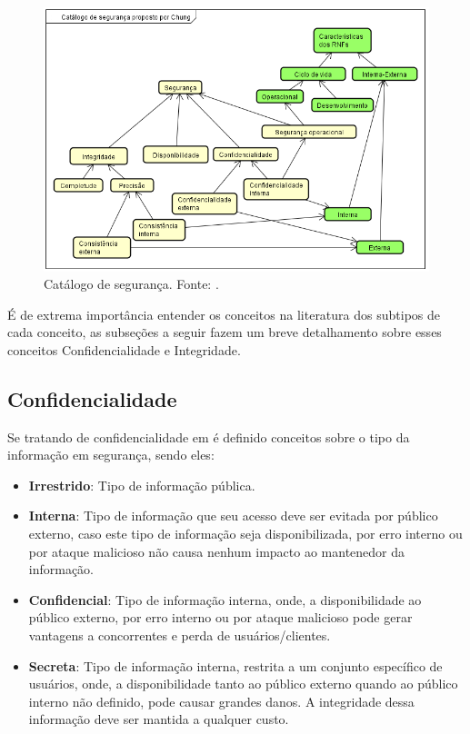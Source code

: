 \begin{figure}[h!]
	\centering
	\includegraphics[keepaspectratio=true,scale=0.9]{figuras/catalogoSegurancaChung.PNG}
	\caption{Catálogo de segurança. Fonte: \cite{chung2012non}.}
	\label{catalogoSegurancaChung}
\end{figure}

É de extrema importância entender os conceitos na literatura dos subtipos de cada conceito, as subseções a seguir fazem um breve detalhamento sobre esses conceitos Confidencialidade e Integridade. 

\subsection{Confidencialidade}

Se tratando de confidencialidade em \cite{reis10classificaccao} é definido conceitos sobre o tipo da informação em segurança, sendo eles: 

\begin{itemize}
	\item \textbf{Irrestrido}: Tipo de informação pública. 
	
	\item \textbf{Interna}: Tipo de informação que seu acesso deve ser evitada por público externo, caso este tipo de informação seja disponibilizada, por erro interno ou por ataque malicioso não causa nenhum impacto ao mantenedor da informação.
	
	\item \textbf{Confidencial}: Tipo de informação interna, onde, a disponibilidade ao público externo, por erro interno ou por ataque malicioso pode gerar vantagens a concorrentes e perda de usuários/clientes. 
	
	\item \textbf{Secreta}: Tipo de informação interna, restrita a um conjunto específico de usuários, onde, a disponibilidade tanto ao público externo quando ao público interno não definido, pode causar grandes danos. A integridade dessa informação deve ser mantida a qualquer custo.
\end{itemize} 

